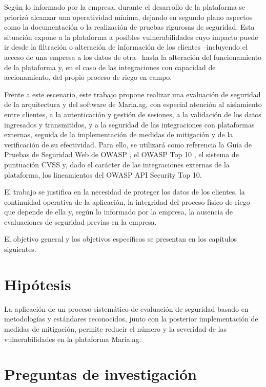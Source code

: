 \documentclass[12pt,letterpaper]{report}
\begin{document}
Según lo informado por la empresa, durante el desarrollo de la plataforma se
priorizó alcanzar una operatividad mínima, dejando en segundo plano aspectos
como la documentación o la realización de pruebas rigurosas de seguridad.
Esta situación expone a la plataforma a posibles vulnerabilidades cuyo
impacto puede ir desde la filtración o alteración de información de los
clientes --incluyendo el acceso de una empresa a los datos de otra-- hasta la
alteración del funcionamiento de la plataforma y, en el caso de las
integraciones con capacidad de accionamiento, del propio proceso de riego en
campo.

Frente a este escenario, este trabajo propone realizar una evaluación de
seguridad de la arquitectura y del software de Maria.ag, con especial
atención al aislamiento entre clientes, a la autenticación y gestión de
sesiones, a la validación de los datos ingresados y transmitidos, y a la
seguridad de las integraciones con plataformas externas, seguida de la
implementación de medidas de mitigación y de la verificación de su
efectividad. Para ello, se utilizará como referencia la Guía de Pruebas de
Seguridad Web de OWASP \autocite{owasp2024wstg}, el OWASP Top 10
\autocite{owasp2025top10}, el sistema de puntuación CVSS
\autocite{first2023cvss} y, dado el carácter de las integraciones externas de
la plataforma, los lineamientos del OWASP API Security Top 10.

El trabajo se justifica en la necesidad de proteger los datos de los clientes,
la continuidad operativa de la aplicación, la integridad del proceso físico
de riego que depende de ella y, según lo informado por la empresa, la
ausencia de evaluaciones de seguridad previas en la empresa.

El objetivo general y los objetivos específicos se presentan en los capítulos
siguientes.

\newpage

\chapter*{Hipótesis}

La aplicación de un proceso sistemático de evaluación de seguridad basado en metodologías y estándares reconocidos, junto con la posterior implementación de medidas de mitigación, permite reducir el número y la severidad de las vulnerabilidades en la plataforma Maria.ag.
\newpage

\chapter*{Preguntas de investigación}
\end{document}
